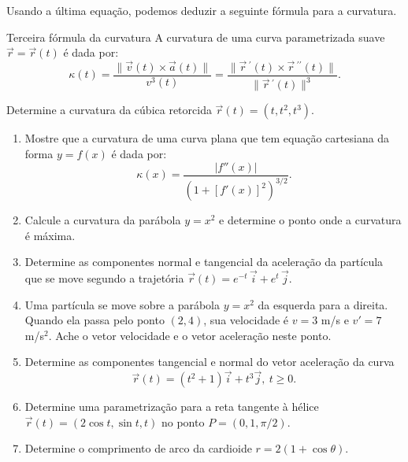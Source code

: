 Usando a última equação, podemos deduzir a seguinte fórmula para a curvatura.
\begin{caixaazul}{Terceira fórmula da curvatura}{}
A curvatura de uma curva parametrizada suave $\vec{r}=\vec{r}(t)$ é dada por:
\[\kappa(t)=\frac{\|\vec{v}(t)\times \vec{a}(t)\|}{v^3(t)}=\frac{\|\vec{r}\,^\prime(t)\times \vec{r}\,^{\prime\prime}(t)\|}{\|\vec{r}\,^\prime(t)\|^3}.\]
\end{caixaazul}
\vfill

\begin{exeb}{}{}
Determine a curvatura da cúbica retorcida $\vec{r}(t)=(t,t^2,t^3)$.
\end{exeb}
\newpage


\begin{casab}{}{}
\begin{enumerate}

\item  Mostre que a curvatura de uma curva plana que tem equação cartesiana da forma $y=f(x)$ é dada por:
\[\kappa(x)=\frac{|f''(x)|}{\left(1+[f'(x)]^2\right)^{3/2}}.\]

\item Calcule a curvatura da parábola $y=x^2$ e determine o ponto onde a curvatura é máxima.

\item Determine as componentes normal e tangencial da aceleração da partícula que se move segundo a trajetória $\vec{r}(t)=e^{-t}\,\vec{i}+e^t\,\vec{j}$.

\item Uma partícula se move sobre a parábola $y=x^2$ da esquerda para a direita. Quando ela passa pelo ponto $(2,4)$, sua velocidade é $v=3$ m/s e $v'=7$ m/s$^2$. Ache o vetor velocidade e o vetor aceleração neste ponto.

\item Determine as componentes tangencial e normal do vetor aceleração da curva
\[\vec{r}(t)=(t^2+1)\vec{i}+t^3\vec{j}, \ t\geq 0.\]


\item Determine uma parametrização para a reta tangente à hélice $\vec{r}(t)=\left(2\cos t,\sin t, t\right)$ no ponto $P=(0,1,\pi/2)$.

\item Determine o comprimento de arco da cardioide $r=2(1+\cos \theta)$.

	\end{enumerate}
\end{casab}